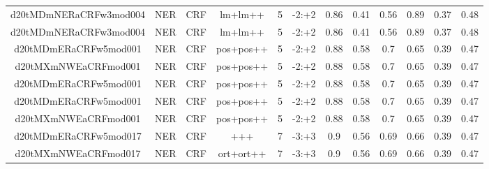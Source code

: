 \documentclass[a4paper]{article}
\begin{document}
\begin{landscape}
\begin{center}
\begin{tabular}{ |c|c|c|c|c|c|c|c|c|c|c|c|}
 	
 
 	
 		
 		\small{ d20tMDmNERaCRFw3mod004 } & NER & CRF & lm+lm++  &  5 &  -2:+2  &  0.86 & 0.41 & 0.56  &  0.89 & 0.37 & 0.48 \\
 		

 	
 
 	
 		
 		\small{ d20tMDmNERaCRFw3mod004 } & NER & CRF & lm+lm++  &  5 &  -2:+2  &  0.86 & 0.41 & 0.56  &  0.89 & 0.37 & 0.48 \\
 		

 	
 
 	
 		
 		\small{ d20tMDmERaCRFw5mod001 } & NER & CRF & pos+pos++  &  5 &  -2:+2  &  0.88 & 0.58 & 0.7  &  0.65 & 0.39 & 0.47 \\
 		

 	
 
 	
 		
 		\small{ d20tMXmNWEaCRFmod001 } & NER & CRF & pos+pos++  &  5 &  -2:+2  &  0.88 & 0.58 & 0.7  &  0.65 & 0.39 & 0.47 \\
 		

 	
 
 	
 		
 		\small{ d20tMDmERaCRFw5mod001 } & NER & CRF & pos+pos++  &  5 &  -2:+2  &  0.88 & 0.58 & 0.7  &  0.65 & 0.39 & 0.47 \\
 		

 	
 
 	
 		
 		\small{ d20tMDmERaCRFw5mod001 } & NER & CRF & pos+pos++  &  5 &  -2:+2  &  0.88 & 0.58 & 0.7  &  0.65 & 0.39 & 0.47 \\
 		

 	
 
 	
 		
 		\small{ d20tMXmNWEaCRFmod001 } & NER & CRF & pos+pos++  &  5 &  -2:+2  &  0.88 & 0.58 & 0.7  &  0.65 & 0.39 & 0.47 \\
 		

 	
 
 	
 		
 		\small{ d20tMDmERaCRFw5mod017 } & NER & CRF & +++  &  7 &  -3:+3  &  0.9 & 0.56 & 0.69  &  0.66 & 0.39 & 0.47 \\
 		

 	
 
 	
 		
 		\small{ d20tMXmNWEaCRFmod017 } & NER & CRF & ort+ort++  &  7 &  -3:+3  &  0.9 & 0.56 & 0.69  &  0.66 & 0.39 & 0.47 \\
 		


\end{tabular}
\end{center}
\end{landscape}
\end{document}
